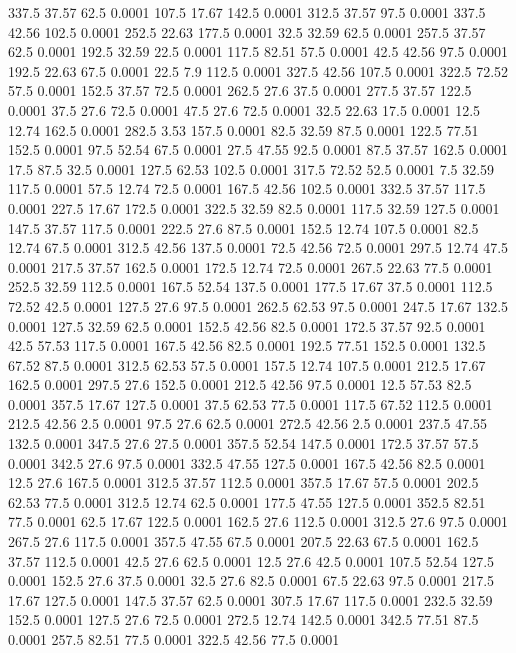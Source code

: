 337.5	37.57	62.5	0.0001
107.5	17.67	142.5	0.0001
312.5	37.57	97.5	0.0001
337.5	42.56	102.5	0.0001
252.5	22.63	177.5	0.0001
32.5	32.59	62.5	0.0001
257.5	37.57	62.5	0.0001
192.5	32.59	22.5	0.0001
117.5	82.51	57.5	0.0001
42.5	42.56	97.5	0.0001
192.5	22.63	67.5	0.0001
22.5	7.9	112.5	0.0001
327.5	42.56	107.5	0.0001
322.5	72.52	57.5	0.0001
152.5	37.57	72.5	0.0001
262.5	27.6	37.5	0.0001
277.5	37.57	122.5	0.0001
37.5	27.6	72.5	0.0001
47.5	27.6	72.5	0.0001
32.5	22.63	17.5	0.0001
12.5	12.74	162.5	0.0001
282.5	3.53	157.5	0.0001
82.5	32.59	87.5	0.0001
122.5	77.51	152.5	0.0001
97.5	52.54	67.5	0.0001
27.5	47.55	92.5	0.0001
87.5	37.57	162.5	0.0001
17.5	87.5	32.5	0.0001
127.5	62.53	102.5	0.0001
317.5	72.52	52.5	0.0001
7.5	32.59	117.5	0.0001
57.5	12.74	72.5	0.0001
167.5	42.56	102.5	0.0001
332.5	37.57	117.5	0.0001
227.5	17.67	172.5	0.0001
322.5	32.59	82.5	0.0001
117.5	32.59	127.5	0.0001
147.5	37.57	117.5	0.0001
222.5	27.6	87.5	0.0001
152.5	12.74	107.5	0.0001
82.5	12.74	67.5	0.0001
312.5	42.56	137.5	0.0001
72.5	42.56	72.5	0.0001
297.5	12.74	47.5	0.0001
217.5	37.57	162.5	0.0001
172.5	12.74	72.5	0.0001
267.5	22.63	77.5	0.0001
252.5	32.59	112.5	0.0001
167.5	52.54	137.5	0.0001
177.5	17.67	37.5	0.0001
112.5	72.52	42.5	0.0001
127.5	27.6	97.5	0.0001
262.5	62.53	97.5	0.0001
247.5	17.67	132.5	0.0001
127.5	32.59	62.5	0.0001
152.5	42.56	82.5	0.0001
172.5	37.57	92.5	0.0001
42.5	57.53	117.5	0.0001
167.5	42.56	82.5	0.0001
192.5	77.51	152.5	0.0001
132.5	67.52	87.5	0.0001
312.5	62.53	57.5	0.0001
157.5	12.74	107.5	0.0001
212.5	17.67	162.5	0.0001
297.5	27.6	152.5	0.0001
212.5	42.56	97.5	0.0001
12.5	57.53	82.5	0.0001
357.5	17.67	127.5	0.0001
37.5	62.53	77.5	0.0001
117.5	67.52	112.5	0.0001
212.5	42.56	2.5	0.0001
97.5	27.6	62.5	0.0001
272.5	42.56	2.5	0.0001
237.5	47.55	132.5	0.0001
347.5	27.6	27.5	0.0001
357.5	52.54	147.5	0.0001
172.5	37.57	57.5	0.0001
342.5	27.6	97.5	0.0001
332.5	47.55	127.5	0.0001
167.5	42.56	82.5	0.0001
12.5	27.6	167.5	0.0001
312.5	37.57	112.5	0.0001
357.5	17.67	57.5	0.0001
202.5	62.53	77.5	0.0001
312.5	12.74	62.5	0.0001
177.5	47.55	127.5	0.0001
352.5	82.51	77.5	0.0001
62.5	17.67	122.5	0.0001
162.5	27.6	112.5	0.0001
312.5	27.6	97.5	0.0001
267.5	27.6	117.5	0.0001
357.5	47.55	67.5	0.0001
207.5	22.63	67.5	0.0001
162.5	37.57	112.5	0.0001
42.5	27.6	62.5	0.0001
12.5	27.6	42.5	0.0001
107.5	52.54	127.5	0.0001
152.5	27.6	37.5	0.0001
32.5	27.6	82.5	0.0001
67.5	22.63	97.5	0.0001
217.5	17.67	127.5	0.0001
147.5	37.57	62.5	0.0001
307.5	17.67	117.5	0.0001
232.5	32.59	152.5	0.0001
127.5	27.6	72.5	0.0001
272.5	12.74	142.5	0.0001
342.5	77.51	87.5	0.0001
257.5	82.51	77.5	0.0001
322.5	42.56	77.5	0.0001

